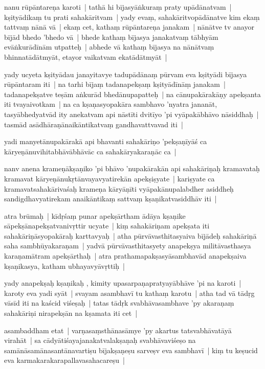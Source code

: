 \documentclass[article,a4paper]{memoir}
\begin{document}
	  \pstart nanu rū\-pā\-ntareṇa karoti | tathā\- hi bī\-jasyā\-ṅkuraṃ praty upā\-dā\-natvam | kṣityā\-dikaṃ tu prati sahakā\-ritvam | yady evaṃ, sahakā\-ritvopā\-dā\-natve kim ekaṃ tattvaṃ nā\-nā\- vā\- | ekaṃ cet, kathaṃ rū\-pā\-ntareṇa janakam | nā\-nā\-tve tv anayor bī\-jā\-d bhedo 'bhedo vā\- | bhede kathaṃ bī\-jasya janakatvaṃ tā\-bhyā\-m evā\-ṅkurā\-dī\-nā\-m utpatteḥ | abhede vā\- kathaṃ bī\-jasya na nā\-nā\-tvaṃ bhinnatā\-dā\-tmyā\-t, etayor vaikatvam ekatā\-dā\-tmyā\-t |
	\pend
      

	  \pstart yady ucyeta kṣityā\-dau janayitavye tadupā\-dā\-naṃ pū\-rvam eva kṣityā\-di bī\-jasya rū\-pā\-ntaram iti | na tarhi bī\-jaṃ tadanapekṣaṃ kṣityā\-dī\-nā\-ṃ janakam | tadanapekṣatve teṣā\-m aṅkurā\-d bhedā\-nupapatteḥ | na cā\-nupakā\-rakā\-ṇy apekṣanta iti tvayaivotkam | na ca kṣaṇasyopakā\-ra sambhavo 'nyatra jananā\-t, tasyā\-bhedyatvā\-d ity anekatvam api nā\-stī\-ti dvitī\-yo 'pi vyā\-pakā\-bhā\-vo nā\-siddhaḥ | tasmā\-d asā\-dhā\-raṇā\-naikā\-ntikatvaṃ gandhavattvavad iti |
	\pend
      

	  \pstart yadi manyetā\-nupakā\-rakā\- api bhavanti sahakā\-riṇo 'pekṣaṇī\-yā\-ś ca kā\-ryeṇā\-nuvihitabhā\-vā\-bhā\-vā\-c ca sahakā\-ryakaraṇā\-c ca |
	\pend
      

	  \pstart nanv anena krameṇā\-kṣaṇiko 'pi bhā\-vo 'nupakā\-rakā\-n api sahakā\-riṇaḥ kramavataḥ kramavat kā\-ryeṇā\-nukṛtā\-nvayavyatirekā\-n apekṣiṣyate | kariṣyate ca kramavatsahakā\-rivaśaḥ krameṇa kā\-ryā\-ṇī\-ti vyā\-pakā\-nupalabdher asiddheḥ sandigdhavyatirekam anaikā\-ntikaṃ sattvaṃ kṣaṇikatvasiddhā\-v iti |
	\pend
      

	  \pstart atra brū\-maḥ | kī\-dṛśaṃ punar apekṣā\-rtham ā\-dā\-ya kṣaṇike sā\-pekṣā\-napekṣatvanivṛttir ucyate | kiṃ sahakā\-riṇam apekṣata iti sahakā\-riṇā\-syopakā\-raḥ karttavyaḥ | atha pū\-rvā\-vasthitasyaiva bī\-jā\-deḥ sahakā\-riṇā\- saha sambhū\-yakaraṇam | yadvā\- pū\-rvā\-vasthitasyety anapekṣya militā\-vasthasya karaṇamā\-tram apekṣā\-rthaḥ | atra prathamapakṣasyā\-sambhavā\-d anapekṣaiva kṣaṇikasya, katham ubhayavyā\-vṛttiḥ | 
	\pend
      

	  \pstart yady anapekṣaḥ kṣaṇikaḥ , kimity upasarpaṇapratyayā\-bhā\-ve 'pi na karoti | karoty eva yadi syā\-t | svayam asambhavī\- tu kathaṃ karotu | atha tad vā\- tā\-dṛg vā\-sī\-d iti na kaścid viśeṣaḥ | tatas tā\-dṛk svabhā\-vasambhave 'py akaraṇaṃ sahakā\-riṇi nirapekṣā\-n na kṣamata iti cet |
	\pend
      

	  \pstart asambaddham etat | varṇasaṃsthā\-nasā\-mye 'py akartus tatsvabhā\-vatā\-yā\- virahā\-t | sa cā\-dyā\-tiśayajanakatvalakṣaṇaḥ svabhā\-vaviśeṣo na samā\-nā\-samā\-nasantā\-navartiṣu bī\-jakṣaṇeṣu sarveṣv eva sambhavī\- | kiṃ tu keṣucid eva karmakarakarapallavasahacareṣu |
	\pend
      
\end{document}
